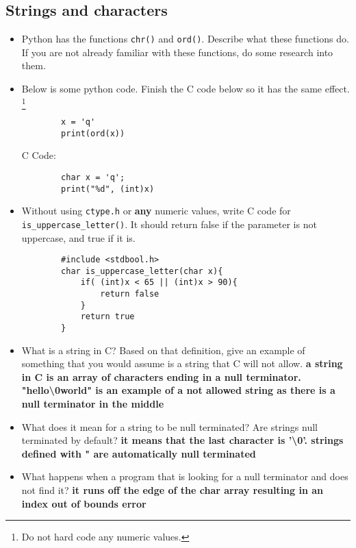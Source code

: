 \documentclass{article}
\begin{document}
\subsection{Strings and characters}
\begin{itemize}
    \item Python has the functions \texttt{chr()} and \texttt{ord()}. Describe what these functions do. If you are not already familiar with these functions, do some research into them. 
    \item Below is some python code. Finish the C code below so it has the same effect. \footnote{Do not hard code any numeric values.}
    \begin{lstlisting}
        x = 'q'
        print(ord(x))
    \end{lstlisting}
    C Code:
    \begin{lstlisting}
        char x = 'q';
        print("%d", (int)x)
    \end{lstlisting}
    \item Without using \texttt{ctype.h} or \textbf{any} numeric values, write C code for \texttt{is_uppercase_letter()}. It should return false if the parameter is not uppercase, and true if it is. 
    \begin{lstlisting}
        #include <stdbool.h>
        char is_uppercase_letter(char x){
            if( (int)x < 65 || (int)x > 90){
                return false
            }
            return true
        }
    \end{lstlisting}
    
    \item What is a string in C? Based on that definition, give an example of something that you would assume is a string that C will not allow. \textbf{a string in C is an array of characters ending in a null terminator. "hello\textbackslash0world" is an example of a not allowed string as there is a null terminator in the middle}
    \item What does it mean for a string to be null terminated? Are strings null terminated by default? \textbf{it means that the last character is '\textbackslash0'. strings defined with " are automatically null terminated}
    \item What happens when a program that is looking for a null terminator and does not find it? \textbf{it runs off the edge of the char array resulting in an index out of bounds error}
    
\end{itemize}
\end{document}
